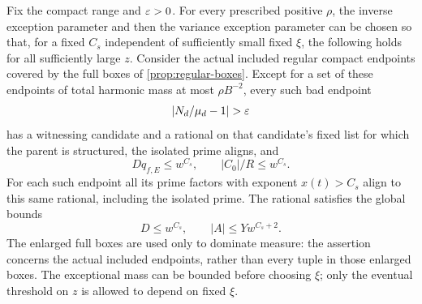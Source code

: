 \begin{corollary}\label{cor:hard-endpoints}
Fix the compact range and \(\varepsilon>0\).
For every prescribed positive \(\rho\), the inverse exception parameter
and then the variance exception parameter can be chosen so that, for a
fixed \(C_s\) independent of sufficiently small fixed \(\xi\), the
following holds for all sufficiently large \(z\).
Consider the actual included regular compact endpoints covered by the
full boxes of \cref{prop:regular-boxes}. Except for a set of these
endpoints of total harmonic mass at most \(\rho B^{-2}\), every such
bad endpoint
\[
 |N_d/\mu_d-1|>\eps
\]
has a witnessing candidate and a rational on that candidate's fixed
list for which the parent is structured, the isolated prime aligns, and
\begin{equation}\label{eq:variance-hard}
 Dq_{f,E}\le w^{C_s},
 \qquad |C_0|/R\le w^{C_s}.
\end{equation}
For each such endpoint all its prime factors with exponent
\(x(t)>C_s\) align to this same rational, including the isolated prime.
The rational satisfies the global bounds
\begin{equation}\label{eq:variance-global-height}
 D\le w^{C_s},
 \qquad |A|\le Yw^{C_s+2}.
\end{equation}
The enlarged full boxes are used only to dominate measure: the assertion
concerns the actual included endpoints, rather than every tuple in
those enlarged boxes.
The exceptional mass can be bounded before choosing \(\xi\); only the
eventual threshold on \(z\) is allowed to depend on fixed \(\xi\).
\end{corollary}

